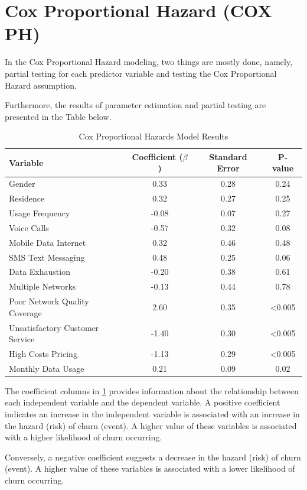 \documentclass[doublespacing]{report} [12px]%
\begin{document}
\section{Cox Proportional Hazard (COX PH)}

In the Cox Proportional Hazard modeling, two things are mostly done, namely, partial testing for each predictor variable and testing the Cox Proportional Hazard assumption. 
 
Furthermore, the results of parameter estimation and partial testing are presented in the Table below.


\begin{table}[H]
\centering
\begin{tabular}{lccc}
\toprule
Variable & Coefficient ($\beta$) & Standard Error & P-value\\
\midrule
Gender & 0.33 & 0.28 & 0.24 \\
Residence & 0.32 & 0.27 & 0.25 \\
Usage Frequency & -0.08 & 0.07 & 0.27 \\
Voice Calls & -0.57 & 0.32 & 0.08 \\
Mobile Data Internet & 0.32 & 0.46 & 0.48 \\
SMS Text Messaging & 0.48 & 0.25 & 0.06 \\
Data Exhaustion & -0.20 & 0.38 & 0.61 \\
Multiple Networks & -0.13 & 0.44 & 0.78 \\
Poor Network Quality Coverage & 2.60 & 0.35 & <0.005 \\
Unsatisfactory Customer Service & -1.40 & 0.30 & <0.005 \\
High Costs Pricing & -1.13 & 0.29 & <0.005 \\
Monthly Data Usage & 0.21 & 0.09 & 0.02 \\
\bottomrule
\end{tabular}
\caption{Cox Proportional Hazards Model Results}
\label{tab:cox_ph_results}
\end{table}


The coefficient columns in \ref{tab:cox_ph_results} provides information about the relationship between each independent variable and the dependent variable. A positive coefficient indicates an increase in the independent variable is associated with an increase in the hazard (risk) of churn (event). A higher value of these variables is associated with a higher likelihood of churn occurring. 

Conversely, a negative coefficient suggests a decrease in the hazard (risk) of churn (event). A higher value of these variables is associated with a lower likelihood of churn occurring.
\end{document}
